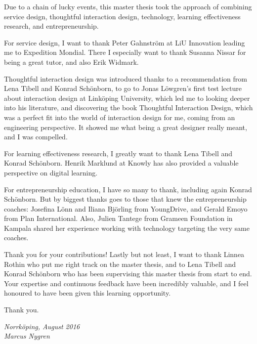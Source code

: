 \begin{acknowledgments}

  Due to a chain of lucky events, this master thesis took the approach of combining service design, thoughtful interaction design, technology, learning effectiveness research, and entrepreneurship.

For service design, I want to thank Peter Gahnström at LiU Innovation leading me to Expedition Mondial. There I especially want to thank Susanna Nissar for being a great tutor, and also Erik Widmark.

Thoughtful interaction design was introduced thanks to a recommendation from Lena Tibell and Konrad Schönborn, to go to Jonas Löwgren's first test lecture about interaction design at Linköping University, which led me to looking deeper into his literature, and discovering the book Thoughtful Interaction Design, which was a perfect fit into the world of interaction design for me, coming from an engineering perspective. It showed me what being a great designer really meant, and I was compelled.

For learning effectiveness research, I greatly want to thank Lena Tibell and Konrad Schönborn. Henrik Marklund at Knowly has also provided a valuable perspective on digital learning.

For entrepreneurship education, I have so many to thank, including again Konrad Schönborn. But by biggest thanks goes to those that knew the entrepreneurship coaches: Josefina Lönn and Iliana Björling from YoungDrive, and Gerald Emoyo from Plan International. Also, Julien Tantege from Grameen Foundation in Kampala shared her experience working with technology targeting the very same coaches.

Thank you for your contributions! Lastly but not least, I want to thank Linnea Rothin who put me right track on the master thesis, and to Lena Tibell and Konrad Schönborn who has been supervising this master thesis from start to end. Your expertise and continuous feedback have been incredibly valuable, and I feel honoured to have been given this learning opportunity.

Thank you.


  \addvspace{1em}
  \begin{flushright}
    \textit{%
      Norrköping, August 2016\\
      Marcus Nygren%
    }
  \end{flushright}
\end{acknowledgments}
